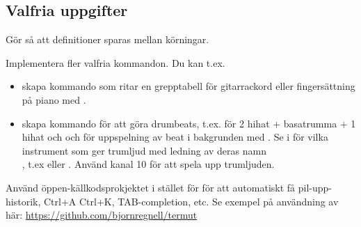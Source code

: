 \Task 


\subsection{Valfria uppgifter}

\Task Gör så att definitioner sparas mellan körningar.

\Task Implementera fler valfria kommandon. Du kan t.ex.
\begin{itemize}
\item skapa kommando som ritar en grepptabell för gitarrackord eller fingersättning på piano med .
\item skapa kommando för att göra drumbeats, t.ex.  för 2 hihat + basatrumma + 1 hihat och  och  för uppspelning av beat i bakgrunden med . Se i  för vilka instrument som ger trumljud med ledning av deras namn \\, t.ex  eller . Använd kanal 10 för att spela upp trumljuden.
\end{itemize}

\Task Använd öppen-källkodsprokjektet  i stället för  för att automatiskt få pil-upp-historik, Ctrl+A Ctrl+K, TAB-completion, etc. Se exempel på användning av  här: \url{https://github.com/bjornregnell/termut}


%
%
%
%
%
%
%
%
%
